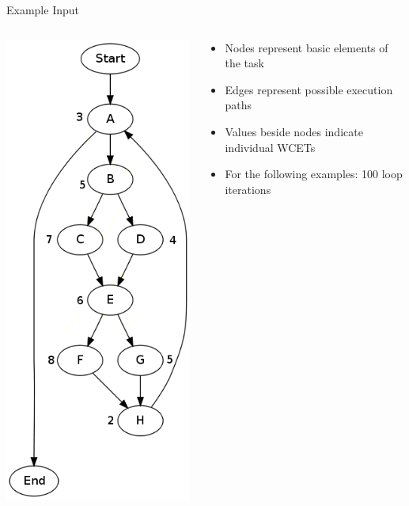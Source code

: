 \documentclass{beamer}
\begin{document}
\begin{frame}{Example Input}
  \begin{columns}
    \begin{column}{0.25\textwidth}
      \includegraphics[scale=0.3]{input.png}
    \end{column}
    \begin{column}{0.75\textwidth}
      \begin{itemize}
        \item Nodes represent basic elements of the task
        \item Edges represent possible execution paths
        \item Values beside nodes indicate individual WCETs
        \item For the following examples: 100 loop iterations
      \end{itemize}
    \end{column}
  \end{columns}
\end{frame}
\end{document}
